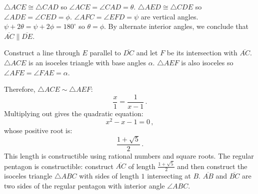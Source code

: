 \documentclass[11pt,a4paper]{article}
\newcommand*{\disfrac}[2]{\displaystyle\frac{#1}{#2}}
\begin{document}
$\triangle ACE\cong \triangle CAD$ so $\angle ACE=\angle CAD=\theta$. $\triangle AED\cong\triangle CDE$ so $\angle ADE=\angle CED=\phi$. $\angle AFC=\angle EFD=\psi$ are vertical angles.
$\psi+2\theta=\psi+ 2\phi=180^\circ$ so $\theta=\phi$.
By alternate interior angles, we conclude that $\overline{AC}\parallel \overline{DE}$.


Construct a line through $E$ parallel to $\overline{DC}$ and let $F$ be its intersection with $\overline{AC}$. $\triangle ACE$ is an isoceles triangle with base angles $\alpha$. $\triangle AEF$ is also isoceles so $\angle AFE=\angle FAE=\alpha$. \begin{center}
\end{center}

Therefore, $\triangle ACE\sim\triangle AEF$:
\[
\disfrac{x}{1}=\disfrac{1}{x-1}\,.
\]
Multiplying out gives the quadratic equation:
\[
x^2-x-1=0\,,
\]
whose positive root is:
\[
\disfrac{1+\sqrt{5}}{2}\,.
\]
This length is constructible using rational numbers and square roots. The regular pentagon is constructible: construct $\overline{AC}$ of length $\frac{1+\sqrt{5}}{2}$ and then construct the isoceles triangle $\triangle ABC$ with sides of length $1$ intersecting at $B$. $\overline{AB}$ and $\overline{BC}$ are two sides of the regular pentagon with interior angle $\angle ABC$.

\newpage



\end{document}

